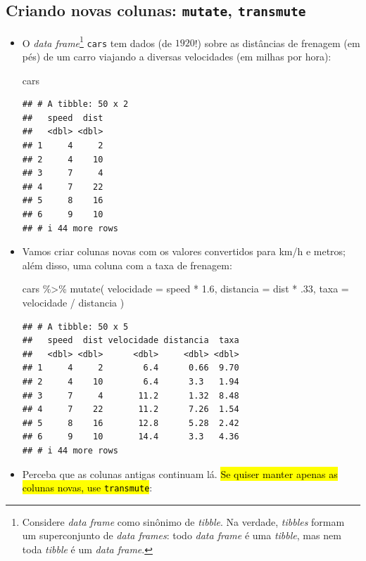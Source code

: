 \documentclass[
  11pt]{report}
\newenvironment{Shaded}{\begin{snugshade}}{\end{snugshade}}
\newcommand{\AttributeTok}[1]{\textcolor[rgb]{0.77,0.63,0.00}{#1}}
\newcommand{\DecValTok}[1]{\textcolor[rgb]{0.00,0.00,0.81}{#1}}
\newcommand{\FloatTok}[1]{\textcolor[rgb]{0.00,0.00,0.81}{#1}}
\newcommand{\FunctionTok}[1]{\textcolor[rgb]{0.00,0.00,0.00}{#1}}
\newcommand{\NormalTok}[1]{#1}
\newcommand{\SpecialCharTok}[1]{\textcolor[rgb]{0.00,0.00,0.00}{#1}}
\renewenvironment{Shaded}{
    \begin{mdframed}[%
      roundcorner=2pt,%
      innerleftmargin=5pt,%
      innerrightmargin=5pt,%
      topline=true,%
      leftline=true,%
      rightline=true,%
      bottomline=true,%
      linewidth=0.5pt,%
      linecolor=black!20,%
      backgroundcolor=black!2,%
      skipabove=2ex,%
      skipbelow=2.5ex%
    ]%
  }
  {
    \end{mdframed}
  }
\begin{document}
\hypertarget{criando-novas-colunas-mutate-transmute}{%
\subsection{\texorpdfstring{Criando novas colunas: \texttt{mutate}, \texttt{transmute}}{Criando novas colunas: mutate, transmute}}\label{criando-novas-colunas-mutate-transmute}}

\begin{itemize}
\item
  O \emph{data frame}\footnote{Considere \emph{data frame} como sinônimo de \emph{tibble}. Na verdade, \emph{tibbles} formam um superconjunto de \emph{data frames}: todo \emph{data frame} é uma \emph{tibble}, mas nem toda \emph{tibble} é um \emph{data frame}.} \texttt{cars} tem dados (de $1920$!) sobre as distâncias de frenagem (em pés) de um carro viajando a diversas velocidades (em milhas por hora):

\begin{Shaded}
\begin{Highlighting}[]
\NormalTok{cars}
\end{Highlighting}
\end{Shaded}

\begin{verbatim}
## # A tibble: 50 x 2
##   speed  dist
##   <dbl> <dbl>
## 1     4     2
## 2     4    10
## 3     7     4
## 4     7    22
## 5     8    16
## 6     9    10
## # i 44 more rows
\end{verbatim}
\item
  Vamos criar colunas novas com os valores convertidos para km/h e metros; além disso, uma coluna com a taxa de frenagem:

\begin{Shaded}
\begin{Highlighting}[]
\NormalTok{cars }\SpecialCharTok{\%\textgreater{}\%} 
  \FunctionTok{mutate}\NormalTok{(}
    \AttributeTok{velocidade =}\NormalTok{ speed }\SpecialCharTok{*} \FloatTok{1.6}\NormalTok{,}
    \AttributeTok{distancia =}\NormalTok{ dist }\SpecialCharTok{*}\NormalTok{ .}\DecValTok{33}\NormalTok{,}
    \AttributeTok{taxa =}\NormalTok{ velocidade }\SpecialCharTok{/}\NormalTok{ distancia}
\NormalTok{  )}
\end{Highlighting}
\end{Shaded}

\begin{verbatim}
## # A tibble: 50 x 5
##   speed  dist velocidade distancia  taxa
##   <dbl> <dbl>      <dbl>     <dbl> <dbl>
## 1     4     2        6.4      0.66  9.70
## 2     4    10        6.4      3.3   1.94
## 3     7     4       11.2      1.32  8.48
## 4     7    22       11.2      7.26  1.54
## 5     8    16       12.8      5.28  2.42
## 6     9    10       14.4      3.3   4.36
## # i 44 more rows
\end{verbatim}
\item
  Perceba que as colunas antigas continuam lá. {\hl{Se quiser manter apenas as colunas novas, use {\mbox{\texttt{transmute}}}}}:


\end{itemize}
\end{document}
